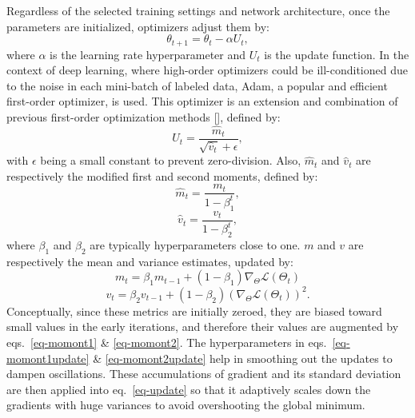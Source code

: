 Regardless of the selected training settings and network architecture, once the parameters are initialized, optimizers adjust them by:
%
\begin{equation}\label{eq-optimization}
\theta_{t+1} = \theta_t - \alpha U_t,
\end{equation}
%
where \(\alpha\) is the learning rate hyperparameter and \(U_t\) is the update function. In the context of deep learning, where high-order optimizers could be ill-conditioned due to the noise in each mini-batch of labeled data, Adam, a popular and efficient first-order optimizer, is used. This optimizer is an extension and combination of previous first-order optimization methods [\cite{kiefer1952, polyak1964, nesterov1983, duchi2011, hinton2012}], defined by:
%
\begin{equation}\label{eq-update}
U_t = \frac{\hat{m}_t}{\sqrt{\hat{v}_t} + \epsilon},
\end{equation}
%
with \(\epsilon\) being a small constant to prevent zero-division. Also, \(\hat{m}_t\) and \(\hat{v}_t\) are respectively the modified first and second moments, defined by:
%
\begin{equation}\label{eq-momont1}
\hat{m}_t = \frac{m_t}{1-\beta_1^t},
\end{equation}
%
\begin{equation}\label{eq-momont2}
\hat{v}_t = \frac{v_t}{1-\beta_2^t},
\end{equation}
%
where \(\beta_1\) and \(\beta_2\) are typically hyperparameters close to one. \(m\) and \(v\) are respectively the mean and variance estimates, updated by:
%
\begin{equation}\label{eq-momont1update}
{m}_t = \beta_1{m}_{t-1} + (1-\beta_1)\nabla_{\Theta} \mathcal{L}(\Theta_t)
\end{equation}
%
\begin{equation}\label{eq-momont2update}
{v}_t = \beta_2 {v}_{t-1} + (1-\beta_2)\left(\nabla_{\Theta} \mathcal{L}(\Theta_t)\right)^2.
\end{equation}
%
Conceptually, since these metrics are initially zeroed, they are biased toward small values in the early iterations, and therefore their values are augmented by eqs.~\ref{eq-momont1} \& \ref{eq-momont2}. The hyperparameters in eqs.~\ref{eq-momont1update} \& \ref{eq-momont2update} help in smoothing out the updates to dampen oscillations. These accumulations of gradient and its standard deviation are then applied into eq.~\ref{eq-update} so that it adaptively scales down the gradients with huge variances to avoid overshooting the global minimum.

